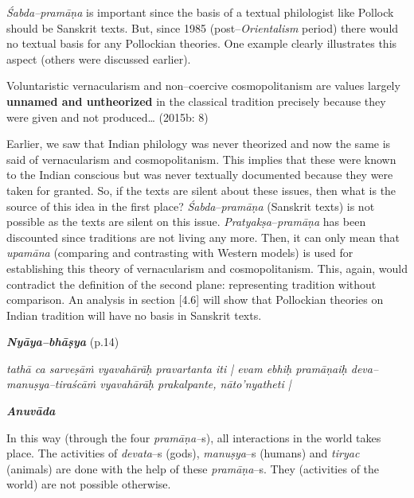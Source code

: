 
\textit{Śabda–pramāṇa} is important since the basis of a textual philologist like Pollock should be Sanskrit texts. But, since 1985 (post–\textit{Orientalism} period) there would no textual basis for any Pollockian theories. One example clearly illustrates this aspect (others were discussed earlier).

\begin{myquote}
Voluntaristic vernacularism and non–coercive cosmopolitanism are values largely \textbf{unnamed and untheorized} in the classical tradition precisely because they were given and not produced… (2015b: 8)
\end{myquote}

Earlier, we saw that Indian philology was never theorized and now the same is said of vernacularism and cosmopolitanism. This implies that these were known to the Indian conscious but was never textually documented because they were taken for granted. So, if the texts are silent about these issues, then what is the source of this idea in the first place? \textit{Śabda}–\textit{pramāṇa} (Sanskrit texts) is not possible as the texts are silent on this issue. \textit{Pratyakṣa}–\textit{pramāṇa} has been discounted since traditions are not living any more. Then, it can only mean that \textit{upamāna} (comparing and contrasting with Western models) is used for establishing this theory of vernacularism and cosmopolitanism. This, again, would contradict the definition of the second plane: representing tradition without comparison. An analysis in section [4.6] will show that Pollockian theories on Indian tradition will have no basis in Sanskrit texts.

\textit{\textbf{Nyāya–bhāṣya}} (p.14)

\begin{myquote}
\textit{tathā ca sarveṣāṁ vyavahārāḥ pravartanta iti | evam ebhiḥ pramāṇaiḥ deva–manuṣya–tiraścāṁ vyavahārāḥ prakalpante, nāto'nyatheti |}
\end{myquote}

\textit{\textbf{Anuvāda}}

In this way (through the four \textit{pramāṇa–}s), all interactions in the world takes place. The activities of \textit{devata}–s (gods), \textit{manuṣya}–s (humans) and \textit{tiryac} (animals) are done with the help of these \textit{pramāṇa}–s. They (activities of the world) are not possible otherwise.

